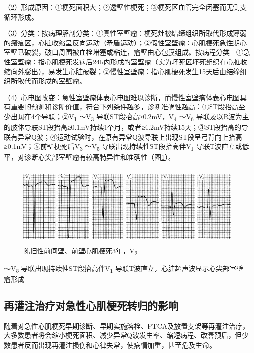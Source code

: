 （2）形成原因：①梗死面积大；②透壁性梗死；③梗死区血管完全闭塞而无侧支循环形成。

（3）分类：按病理解剖分类：①真性室壁瘤：梗死灶被结缔组织所取代形成薄弱的瘢痕区，心脏收缩呈反向运动（矛盾运动）；②假性室壁瘤：心肌梗死急性期心室壁已破裂，破口周围被血栓堵塞或粘连，瘤壁由心包膜组成。按病程分类：①急性室壁瘤：指心肌梗死发病后24h内形成的室壁瘤（实为坏死区坏死组织在心脏收缩向外膨出），易发生心脏破裂；②慢性室壁瘤：指心肌梗死发生15天后由结缔组织所取代而形成的室壁瘤。

（4）心电图改变：急性室壁瘤体表心电图难以诊断，而慢性室壁瘤体表心电图具有重要的预测和诊断价值，符合下列条件越多，诊断准确性越高：①ST段抬高至少出现在4个导联；②V\textsubscript{1}
～V\textsubscript{3} 导联ST段抬高≥0.2mV，V\textsubscript{4}
～V\textsubscript{6}
导联及以R波为主的肢体导联ST段抬高≥0.1mV持续1个月，或者≥0.2mV持续15天；③ST段抬高的导联有异常Q波；④运动试验时，在原有异常Q波导联上出现ST段呈弓背向上抬高≥0.1mV；⑤前壁梗死后V\textsubscript{3}
～V\textsubscript{5} 导联出现持续性ST段抬高伴V\textsubscript{1}
导联T波直立或低平，对诊断心尖部室壁瘤有较高特异性和准确性（图\ref{fig44-16}）。

\begin{figure}[!htbp]
 \centering
 \includegraphics[width=5.08333in,height=1.59375in]{./images/Image00724.jpg}
 \captionsetup{justification=centering}
 \caption{陈旧性前间壁、前壁心肌梗死3年，V\textsubscript{2}}
 \label{fig44-16}
  \end{figure} 
～V\textsubscript{5} 导联出现持续性ST段抬高伴V\textsubscript{1}
导联T波直立，心脏超声波显示心尖部室壁瘤形成

\protect\hypertarget{text00052.htmlux5cux23subid631}{}{}

\subsection{再灌注治疗对急性心肌梗死转归的影响}

随着对急性心肌梗死早期诊断、早期实施溶栓、PTCA及放置支架等再灌注治疗，大多数患者将会缩小梗死面积、减少异常Q波发生率、缩短病程、改善预后，但少数患者反而出现再灌注损伤和心律失常，使病情加重，甚至危及生命。

